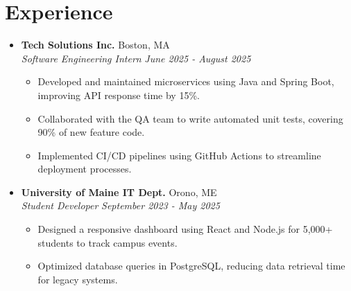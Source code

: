 \documentclass[letterpaper,11pt]{article}
\begin{document}
\section{Experience}
  \begin{itemize}[leftmargin=*]
    \item[]
      \textbf{Tech Solutions Inc.} \hfill Boston, MA \\
      \textit{Software Engineering Intern} \hfill \textit{June 2025 - August 2025}
      \begin{itemize}
        \item Developed and maintained microservices using Java and Spring Boot, improving API response time by 15\%.
        \item Collaborated with the QA team to write automated unit tests, covering 90\% of new feature code.
        \item Implemented CI/CD pipelines using GitHub Actions to streamline deployment processes.
      \end{itemize}
      
    \item[]
      \textbf{University of Maine IT Dept.} \hfill Orono, ME \\
      \textit{Student Developer} \hfill \textit{September 2023 - May 2025}
      \begin{itemize}
        \item Designed a responsive dashboard using React and Node.js for 5,000+ students to track campus events.
        \item Optimized database queries in PostgreSQL, reducing data retrieval time for legacy systems.
      \end{itemize}
  \end{itemize}


\end{document}

